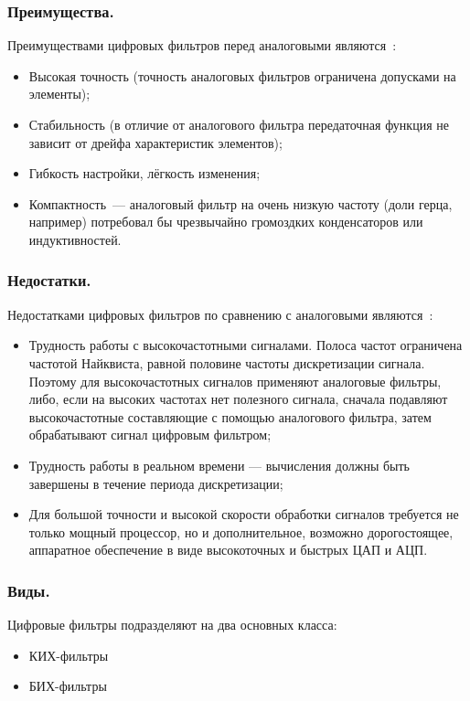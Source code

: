 \subsubsection{Преимущества. }
Преимуществами цифровых фильтров перед аналоговыми являются~\cite{Wiki_DigitalFilter}:
\begin{itemize}
	\item Высокая точность (точность аналоговых фильтров ограничена допусками на элементы);
	\item Стабильность (в отличие от аналогового фильтра передаточная функция не зависит от дрейфа характеристик элементов);
	\item Гибкость настройки, лёгкость изменения;
	\item Компактность~--- аналоговый фильтр на очень низкую частоту (доли герца, например) потребовал бы чрезвычайно громоздких конденсаторов или индуктивностей.
\end{itemize}

\subsubsection{Недостатки. }
Недостатками цифровых фильтров по сравнению с аналоговыми являются~\cite{Wiki_DigitalFilter}:
\begin{itemize}
	\item Трудность работы с высокочастотными сигналами. Полоса частот ограничена частотой Найквиста, равной половине частоты дискретизации сигнала. Поэтому для высокочастотных сигналов применяют аналоговые фильтры, либо, если на высоких частотах нет полезного сигнала, сначала подавляют высокочастотные составляющие с помощью аналогового фильтра, затем обрабатывают сигнал цифровым фильтром;
	\item Трудность работы в реальном времени — вычисления должны быть завершены в течение периода дискретизации;
	\item Для большой точности и высокой скорости обработки сигналов требуется не только мощный процессор, но и дополнительное, возможно дорогостоящее, аппаратное обеспечение в виде высокоточных и быстрых ЦАП и АЦП.
\end{itemize}

\subsubsection{Виды. }
Цифровые фильтры подразделяют на два основных класса:
\begin{itemize}
	\item КИХ-фильтры
	\item БИХ-фильтры
\end{itemize}

